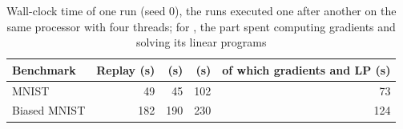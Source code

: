 \begin{table}[t]
\centering
\caption{Wall-clock time of one run (seed 0), the runs executed one after another on the same processor with four threads; for \fsw{}, the part spent computing gradients and solving its linear programs}\label{tab:cost}
\footnotesize
\begin{tabular}{lrrrr}
\toprule
Benchmark & Replay (s) & \method{} (s) & \fsw{} (s) & of which gradients and LP (s) \\
\midrule
MNIST & 49 & 45 & 102 & 73 \\
Biased MNIST & 182 & 190 & 230 & 124 \\
\bottomrule
\end{tabular}
\end{table}
